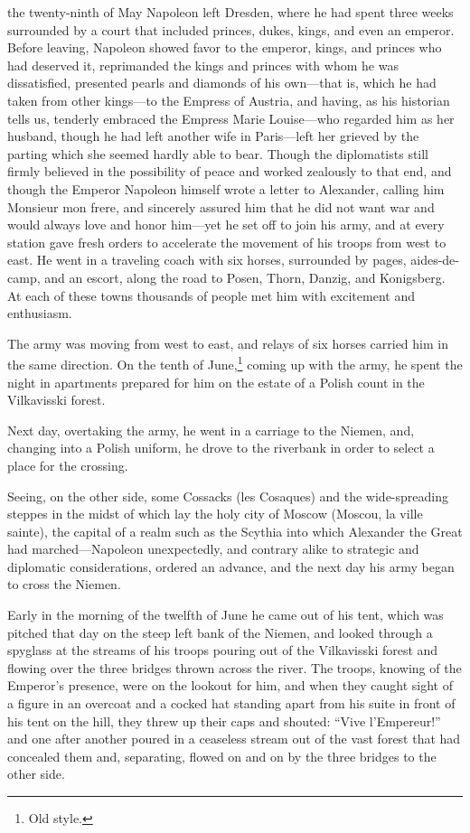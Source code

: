  the twenty-ninth of May Napoleon left Dresden, where he had
spent three weeks surrounded by a court that included princes,
dukes, kings, and even an emperor. Before leaving, Napoleon
showed favor to the emperor, kings, and princes who had deserved
it, reprimanded the kings and princes with whom he was
dissatisfied, presented pearls and diamonds of his own---that is,
which he had taken from other kings---to the Empress of Austria,
and having, as his historian tells us, tenderly embraced the
Empress Marie Louise---who regarded him as her husband, though he
had left another wife in Paris---left her grieved by the parting
which she seemed hardly able to bear. Though the diplomatists
still firmly believed in the possibility of peace and worked
zealously to that end, and though the Emperor Napoleon himself
wrote a letter to Alexander, calling him Monsieur mon frere, and
sincerely assured him that he did not want war and would always
love and honor him---yet he set off to join his army, and at
every station gave fresh orders to accelerate the movement of his
troops from west to east. He went in a traveling coach with six
horses, surrounded by pages, aides-de-camp, and an escort, along
the road to Posen, Thorn, Danzig, and Konigsberg. At each of
these towns thousands of people met him with excitement and
enthusiasm.

The army was moving from west to east, and relays of six horses
carried him in the same direction. On the tenth of
June,\footnote{Old style.}  coming up with the army, he spent the
night in apartments prepared for him on the estate of a Polish
count in the Vilkavisski forest.

Next day, overtaking the army, he went in a carriage to the
Niemen, and, changing into a Polish uniform, he drove to the
riverbank in order to select a place for the crossing.

Seeing, on the other side, some Cossacks (les Cosaques) and the
wide-spreading steppes in the midst of which lay the holy city of
Moscow (Moscou, la ville sainte), the capital of a realm such as
the Scythia into which Alexander the Great had marched---Napoleon
unexpectedly, and contrary alike to strategic and diplomatic
considerations, ordered an advance, and the next day his army
began to cross the Niemen.

Early in the morning of the twelfth of June he came out of his
tent, which was pitched that day on the steep left bank of the
Niemen, and looked through a spyglass at the streams of his
troops pouring out of the Vilkavisski forest and flowing over the
three bridges thrown across the river. The troops, knowing of the
Emperor's presence, were on the lookout for him, and when they
caught sight of a figure in an overcoat and a cocked hat standing
apart from his suite in front of his tent on the hill, they threw
up their caps and shouted: ``Vive l'Empereur!'' and one after
another poured in a ceaseless stream out of the vast forest that
had concealed them and, separating, flowed on and on by the three
bridges to the other side.

